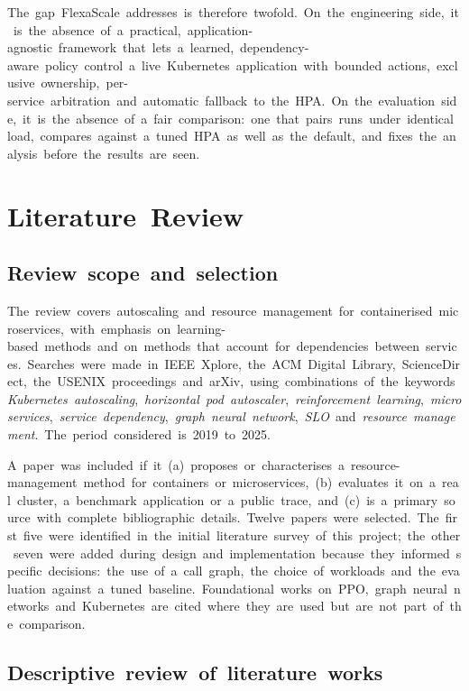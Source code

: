 \documentclass[12pt,a4paper,oneside]{report}
\begin{document}
The~gap~FlexaScale~addresses~is~therefore~twofold.~On~the~engineering~side,~it~is~the~absence~of~a~practical,~application-agnostic~framework~that~lets~a~learned,~dependency-aware~policy~control~a~live~Kubernetes~application~with~bounded~actions,~exclusive~ownership,~per-service~arbitration~and~automatic~fallback~to~the~HPA.~On~the~evaluation~side,~it~is~the~absence~of~a~fair~comparison:~one~that~pairs~runs~under~identical~load,~compares~against~a~tuned~HPA~as~well~as~the~default,~and~fixes~the~analysis~before~the~results~are~seen.


\clearpage
\chapter{Literature~Review}\label{chap:lit}

\section{Review~scope~and~selection}

The~review~covers~autoscaling~and~resource~management~for~containerised~microservices,~with~emphasis~on~learning-based~methods~and~on~methods~that~account~for~dependencies~between~services.~Searches~were~made~in~IEEE~Xplore,~the~ACM~Digital~Library,~ScienceDirect,~the~USENIX~proceedings~and~arXiv,~using~combinations~of~the~keywords~\textit{Kubernetes~autoscaling},~\textit{horizontal~pod~autoscaler},~\textit{reinforcement~learning},~\textit{microservices},~\textit{service~dependency},~\textit{graph~neural~network},~\textit{SLO}~and~\textit{resource~management}.~The~period~considered~is~2019~to~2025.


A~paper~was~included~if~it~(a)~proposes~or~characterises~a~resource-management~method~for~containers~or~microservices,~(b)~evaluates~it~on~a~real~cluster,~a~benchmark~application~or~a~public~trace,~and~(c)~is~a~primary~source~with~complete~bibliographic~details.~Twelve~papers~were~selected.~The~first~five~were~identified~in~the~initial~literature~survey~of~this~project;~the~other~seven~were~added~during~design~and~implementation~because~they~informed~specific~decisions:~the~use~of~a~call~graph,~the~choice~of~workloads~and~the~evaluation~against~a~tuned~baseline.~Foundational~works~on~PPO,~graph~neural~networks~and~Kubernetes~are~cited~where~they~are~used~but~are~not~part~of~the~comparison.


\section{Descriptive~review~of~literature~works}
\end{document}
